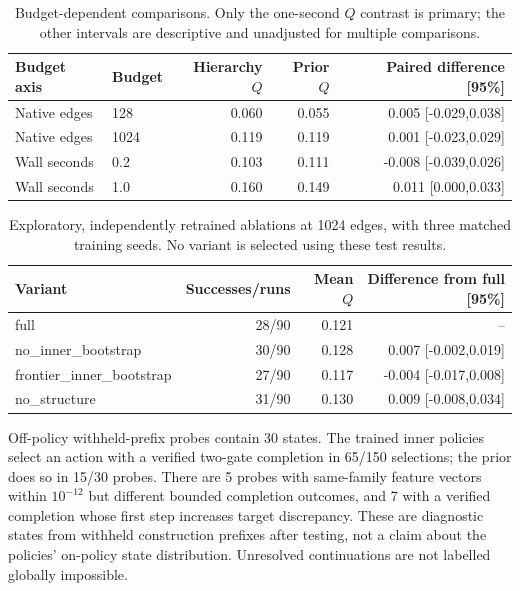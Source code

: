 \begin{table}[htbp]\centering\small

\begin{tabular}{llrrr}\toprule

Budget axis & Budget & Hierarchy $Q$ & Prior $Q$ & Paired difference [95\%] \\ \midrule

Native edges & 128 & 0.060 & 0.055 & 0.005 [-0.029,0.038] \\

Native edges & 1024 & 0.119 & 0.119 & 0.001 [-0.023,0.029] \\

Wall seconds & 0.2 & 0.103 & 0.111 & -0.008 [-0.039,0.026] \\

Wall seconds & 1.0 & 0.160 & 0.149 & 0.011 [0.000,0.033] \\

\bottomrule\end{tabular}\caption{Budget-dependent comparisons. Only the one-second $Q$ contrast is primary; the other intervals are descriptive and unadjusted for multiple comparisons.}\label{tab:budgets}\end{table}

\begin{table}[htbp]\centering\small\begin{tabular}{lrrr}\toprule

Variant & Successes/runs & Mean $Q$ & Difference from full [95\%] \\ \midrule

full & 28/90 & 0.121 & -- \\

no\_inner\_bootstrap & 30/90 & 0.128 & 0.007 [-0.002,0.019] \\

frontier\_inner\_bootstrap & 27/90 & 0.117 & -0.004 [-0.017,0.008] \\

no\_structure & 31/90 & 0.130 & 0.009 [-0.008,0.034] \\

\bottomrule\end{tabular}\caption{Exploratory, independently retrained ablations at 1024 edges, with three matched training seeds. No variant is selected using these test results.}\label{tab:ablations}\end{table}

Off-policy withheld-prefix probes contain 30 states. The trained inner policies select an action with a verified two-gate completion in 65/150 selections; the prior does so in 15/30 probes. There are 5 probes with same-family feature vectors within $10^{-12}$ but different bounded completion outcomes, and 7 with a verified completion whose first step increases target discrepancy. These are diagnostic states from withheld construction prefixes after testing, not a claim about the policies' on-policy state distribution. Unresolved continuations are not labelled globally impossible.


